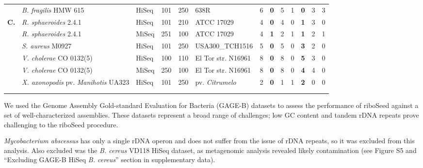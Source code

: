 \documentclass[a4,center,fleqn]{NAR}
\begin{document}
\begin{table*}[!hb]
\begin{tabular}{p{.3cm}p{5.2cm}p{.95cm}p{.75cm}p{.75cm}p{2.63cm}p{.6cm}>{\hfill}p{.4cm}p{.2cm}p{.1cm}>{\hfill}p{.4cm}p{.2cm}p{.1cm}}
    & \textit{B. fragilis} HMW 615   & HiSeq   & 101   & 250   & 638R & 6 & \textbf{0} & 5 & 1  & \textbf{0} & 3 & 3  \\

    \textbf{C.} & \textit{R. sphaeroides} 2.4.1 & HiSeq & 101 & 210 & ATCC 17029  & 4 & \textbf{0} & 4 & 0  & \textbf{1} & 3 & 0  \\

    & \textit{R. sphaeroides} 2.4.1 & MiSeq & 251 & 100 & ATCC 17029  & 4 & \textbf{1} & 2 & 1  & \textbf{1} & 2 & 1  \\

    & \textit{S. aureus} M0927 & HiSeq & 101 & 250 & USA300\_TCH1516 & 5 & \textbf{0} & 5 & 0  & \textbf{3} & 2 & 0  \\

    & \textit{V. cholerae} CO 0132(5) & HiSeq & 100 & 110 & El Tor str. N16961  & 8 & \textbf{0} & 8 & 0  & \textbf{5} & 3 & 0  \\

    & \textit{V. cholerae} CO 0132(5) & MiSeq   & 250   & 100   & El Tor str. N16961 & 8 & \textbf{0} & 8 & 0  & \textbf{4} & 4 & 0  \\

    & \textit{X. axonopodis} pv. \textit{Manihotis} UA323 & HiSeq   & 101   & 250   & pv. \textit{Citrumelo} & 2 & \textbf{0} & 1 & 1  & \textbf{2} & 0 & 0 \\

    \botrule
    \begin{minipage}[t]{.5\textwidth}
      {\tiny
        $\checkmark$  correct assembly; --  unnassembled; $\times$  incorrect assembly\\
      }
    \end{minipage}
  \end{tabular}
\end{table*}




We used the Genome Assembly Gold-standard Evaluation for Bacteria (GAGE-B) datasets \cite{Magoc2013} to assess the performance of riboSeed against a set of well-characterized assemblies. These datasets represent a broad range of challenges; low GC content and tandem rDNA repeats prove challenging to the riboSeed procedure.

\textit{Mycobacterium abscessus} has only a single rDNA operon and does not suffer from the issue of rDNA repeats, so it was excluded from this analysis.  Also excluded was the \textit{B. cereus} VD118 HiSeq dataset, as metagenomic analysis revealed likely contamination (see Figure S5 and ``Excluding GAGE-B HiSeq \textit{B. cereus}'' section in supplementary data).
\end{document}
